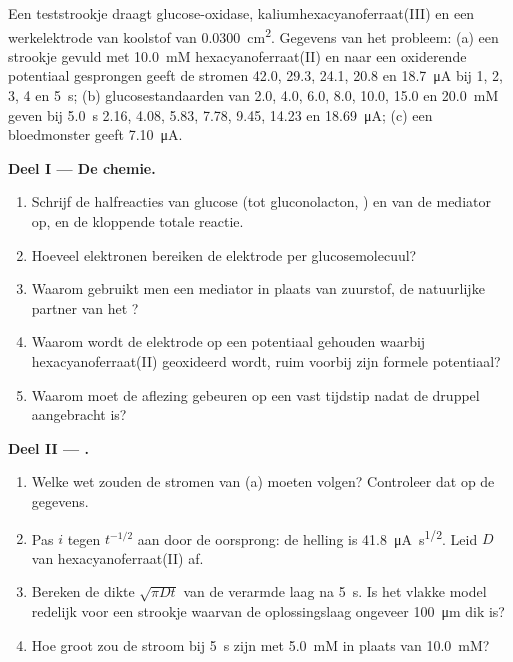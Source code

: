 \begin{problem}
\label{pb:b3:electrode-kinetics:1}
Een teststrookje draagt glucose-oxidase, kaliumhexacyanoferraat(III) en
een werkelektrode van koolstof van \qty{0.0300}{cm^2}. Gegevens van het
probleem: (a) een strookje gevuld met \qty{10.0}{mM} hexacyanoferraat(II)
en naar een oxiderende potentiaal gesprongen geeft de stromen 42.0, 29.3,
24.1, 20.8 en \qty{18.7}{\micro A} bij 1, 2, 3, 4 en \qty{5}{s};
(b) glucosestandaarden van 2.0, 4.0, 6.0, 8.0, 10.0, 15.0 en
\qty{20.0}{mM} geven bij
\qty{5.0}{s} 2.16, 4.08, 5.83, 7.78, 9.45, 14.23 en \qty{18.69}{\micro A};
(c) een bloedmonster geeft
\qty{7.10}{\micro A}.

\medskip\noindent\textbf{Deel I --- De chemie.}
\begin{enumerate}
  \item Schrijf de halfreacties van glucose (tot gluconolacton,
        ) en van de mediator op, en de kloppende totale reactie.
  \item Hoeveel elektronen bereiken de elektrode per glucosemolecuul?
  \item Waarom gebruikt men een mediator in plaats van zuurstof, de
        natuurlijke partner van het ?
  \item Waarom wordt de elektrode op een potentiaal gehouden waarbij
        hexacyanoferraat(II) geoxideerd wordt, ruim voorbij zijn formele
        potentiaal?
  \item Waarom moet de aflezing gebeuren op een vast tijdstip nadat de
        druppel aangebracht is?
\end{enumerate}

\medskip\noindent\textbf{Deel II --- .}
\begin{enumerate}[resume]
  \item Welke wet zouden de stromen van (a) moeten volgen? Controleer dat
        op de gegevens.
  \item Pas $i$ tegen $t^{-1/2}$ aan door de oorsprong: de helling is
        \qty{41.8}{\micro A.s^{1/2}}. Leid
        $D$ van hexacyanoferraat(II) af.
  \item Bereken de dikte $\sqrt{\pi Dt}$ van de verarmde laag na
        \qty{5}{s}. Is het vlakke model redelijk voor een strookje waarvan
        de oplossingslaag ongeveer
        \qty{100}{\micro m} dik is?
  \item Hoe groot zou de stroom bij \qty{5}{s} zijn met \qty{5.0}{mM} in
        plaats van \qty{10.0}{mM}?
\end{enumerate}


\end{problem}
